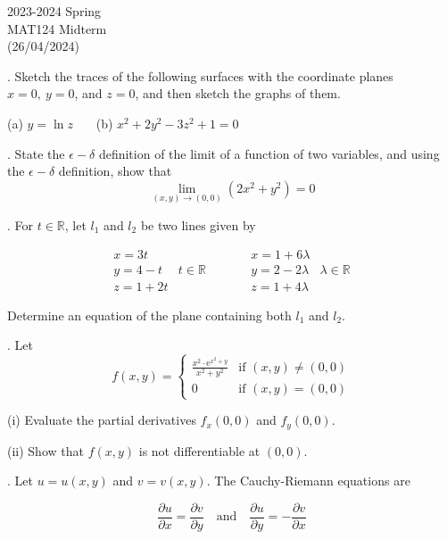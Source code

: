 \documentclass{article}
\begin{document}
\pagestyle{empty}
\large

\begin{center}
2023-2024 Spring \\MAT124 Midterm\\(26/04/2024)
\end{center}

. Sketch the traces of the following surfaces with the coordinate planes $x=0,\:y=0$, and $z=0$, and then sketch the graphs of them.

\hfill

\noindent (a) $y=\ln z$ \ \ \ (b) $x^2+2y^2-3z^2+1=0$

\hfill

. State the $\epsilon-\delta$ definition of the limit of a function of two variables, and using the $\epsilon-\delta$ definition, show that
\[\lim_{(x,y)\to(0,0)}\left(2x^2+y^2\right)=0\]

\hfill

. For $t\in\mathbb{R}$, let $l_1$ and $l_2$ be two lines given by

\[\begin{array}{ccccc}
x=3t&&&x=1+6\lambda&\\
y=4-t&t\in\mathbb{R}&& y=2-2\lambda&\lambda\in\mathbb{R}\\
z=1+2t&&\qquad&z=1+4\lambda&
\end{array}\]

\hfill

\noindent Determine an equation of the plane containing both $l_1$ and $l_2$.

\hfill

. Let
\[f(x,y)=\left\{\begin{array}{cc}
\displaystyle\frac{x^2\cdot\mathrm{e}^{x^2+y}}{x^2+y^2}&\text{if }(x,y)\neq(0,0)\\[1em]
0&\text{if }(x,y)=(0,0)
\end{array}\right.\]

\hfill

\noindent (i) Evaluate the partial derivatives $f_x(0,0)$ and $f_y(0,0)$.

\hfill

\noindent (ii) Show that $f(x,y)$ is not differentiable at $(0,0)$.

\hfill

. Let $u=u(x,y)$ and $v=v(x,y)$. The Cauchy-Riemann equations are

\[\frac{\partial u}{\partial x}=\frac{\partial v}{\partial y}\quad\text{and}\quad\frac{\partial u}{\partial y}=-\frac{\partial v}{\partial x}\]
\end{document}
